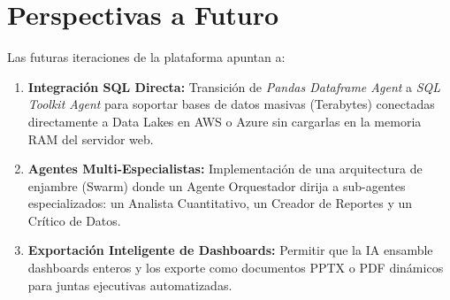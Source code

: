 \documentclass[12pt,a4paper]{article}
\begin{document}
\section{Perspectivas a Futuro}
Las futuras iteraciones de la plataforma apuntan a:
\begin{enumerate}
    \item \textbf{Integración SQL Directa:} Transición de \textit{Pandas Dataframe Agent} a \textit{SQL Toolkit Agent} para soportar bases de datos masivas (Terabytes) conectadas directamente a Data Lakes en AWS o Azure sin cargarlas en la memoria RAM del servidor web.
    \item \textbf{Agentes Multi-Especialistas:} Implementación de una arquitectura de enjambre (Swarm) donde un Agente Orquestador dirija a sub-agentes especializados: un Analista Cuantitativo, un Creador de Reportes y un Crítico de Datos.
    \item \textbf{Exportación Inteligente de Dashboards:} Permitir que la IA ensamble dashboards enteros y los exporte como documentos PPTX o PDF dinámicos para juntas ejecutivas automatizadas.
\end{enumerate}
\end{document}

